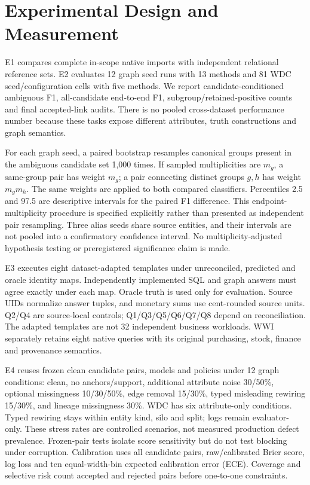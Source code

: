 \documentclass[11pt,letterpaper]{article}
\begin{document}
\section{Experimental Design and Measurement}
E1 compares complete in-scope native imports with independent relational reference sets. E2 evaluates 12 graph seed runs with 13 methods and 81 WDC seed/configuration cells with five methods. We report candidate-conditioned ambiguous F1, all-candidate end-to-end F1, subgroup/retained-positive counts and final accepted-link audits. There is no pooled cross-dataset performance number because these tasks expose different attributes, truth constructions and graph semantics.

For each graph seed, a paired bootstrap resamples canonical groups present in the ambiguous candidate set 1,000 times. If sampled multiplicities are $m_g$, a same-group pair has weight $m_g$; a pair connecting distinct groups $g,h$ has weight $m_gm_h$. The same weights are applied to both compared classifiers. Percentiles 2.5 and 97.5 are descriptive intervals for the paired F1 difference. This endpoint-multiplicity procedure is specified explicitly rather than presented as independent pair resampling. Three alias seeds share source entities, and their intervals are not pooled into a confirmatory confidence interval. No multiplicity-adjusted hypothesis testing or preregistered significance claim is made.

E3 executes eight dataset-adapted templates under unreconciled, predicted and oracle identity maps. Independently implemented SQL and graph answers must agree exactly under each map. Oracle truth is used only for evaluation. Source UIDs normalize answer tuples, and monetary sums use cent-rounded source units. Q2/Q4 are source-local controls; Q1/Q3/Q5/Q6/Q7/Q8 depend on reconciliation. The adapted templates are not 32 independent business workloads. WWI separately retains eight native queries with its original purchasing, stock, finance and provenance semantics.

E4 reuses frozen clean candidate pairs, models and policies under 12 graph conditions: clean, no anchors/support, additional attribute noise 30/50\%, optional missingness 10/30/50\%, edge removal 15/30\%, typed misleading rewiring 15/30\%, and lineage missingness 30\%. WDC has six attribute-only conditions. Typed rewiring stays within entity kind, silo and split; logs remain evaluator-only. These stress rates are controlled scenarios, not measured production defect prevalence. Frozen-pair tests isolate score sensitivity but do not test blocking under corruption. Calibration uses all candidate pairs, raw/calibrated Brier score, log loss and ten equal-width-bin expected calibration error (ECE). Coverage and selective risk count accepted and rejected pairs before one-to-one constraints.
\end{document}
